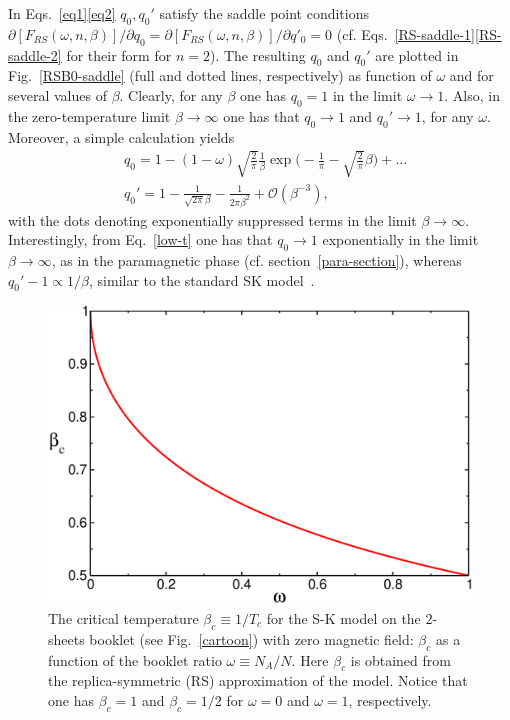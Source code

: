\documentclass[twocolumn,superscriptaddress,prb,10pt]{revtex4-1}
\begin{document}
In Eqs.~\eqref{eq1}\eqref{eq2} $q_0,q_0'$ satisfy the saddle point conditions 
$\partial[F_{RS}(\omega,n,\beta)]/\partial q_0=\partial[F_{RS}(\omega,n,\beta)]/
\partial q'_0=0$ (cf. Eqs.~\eqref{RS-saddle-1}\eqref{RS-saddle-2} for their 
form for $n=2$). The resulting $q_0$ and $q_0'$ are plotted in Fig.~\ref{RSB0-saddle} 
(full and dotted lines, respectively) as function of $\omega$ and for several 
values of $\beta$. Clearly, for any $\beta$ one has $q_0=1$ in the limit 
$\omega\to 1$. Also, in the zero-temperature limit $\beta\to\infty$ one has 
that $q_0\to 1$ and $q_0'\to 1$, for any $\omega$. Moreover, a simple calculation 
yields  
%
\begin{align}
\label{low-t}
& q_0=1 -(1-\omega)\sqrt{\frac{2}{\pi}}\frac{1}{\beta}\exp\Big(-\frac{1}{\pi}-
\sqrt{\frac{2}{\pi}}\beta\Big)+\dots
\\ 
& q_0'=1-\frac{1}{\sqrt{2\pi}\beta}-\frac{1}{2\pi\beta^2}+{\mathcal O}(\beta^{-3}),
\end{align}
%
with the dots denoting exponentially suppressed terms in the limit $\beta\to\infty$. 
Interestingly, from Eq.~\eqref{low-t} one has that $q_0\to 1$ exponentially in the limit $\beta\to\infty$, 
as in the paramagnetic phase (cf. section~\ref{para-section}), whereas 
$q_0'-1\propto 1/\beta$, similar to the standard SK model~\cite{nishimori-book}. 


\begin{figure}[t]
\includegraphics*[width=0.9\linewidth]{./draft_figs/betac}
\caption{
 The critical temperature $\beta_c\equiv 1/T_c$ for the S-K model on the $2$-sheets  
 booklet (see Fig.~\ref{cartoon}) with zero magnetic field: $\beta_c$ as a function 
 of the booklet ratio $\omega\equiv N_A/N$. Here $\beta_c$  is obtained from the 
 replica-symmetric (RS) approximation of the model. Notice that one has $\beta_c=1$ 
 and $\beta_c=1/2$ for $\omega=0$ and $\omega=1$, respectively. 
}
\label{beta_c}
\end{figure}
\end{document}
